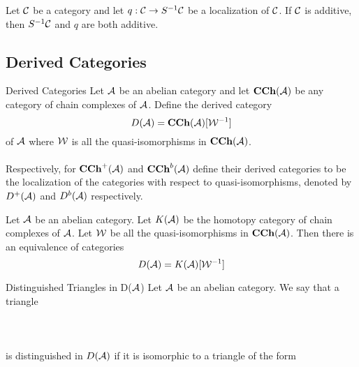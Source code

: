 \documentclass[a4paper]{article}
\begin{document}
\begin{crl}{}{} Let $\mathcal{C}$ be a category and let $q:\mathcal{C}\to S^{-1}\mathcal{C}$ be a localization of $\mathcal{C}$. If $\mathcal{C}$ is additive, then $S^{-1}\mathcal{C}$ and $q$ are both additive. 
\end{crl}

\subsection{Derived Categories}
\begin{defn}{Derived Categories}{} Let $\mathcal{A}$ be an abelian category and let $\bold{CCh}(\mathcal{A})$ be any category of chain complexes of $\mathcal{A}$. Define the derived category $$D(\mathcal{A})=\bold{CCh}(\mathcal{A})[\mathcal{W}^{-1}]$$ of $\mathcal{A}$ where $\mathcal{W}$ is all the quasi-isomorphisms in $\bold{CCh}(\mathcal{A})$. \\~\\

Respectively, for $\bold{CCh}^+(\mathcal{A})$ and $\bold{CCh}^b(\mathcal{A})$ define their derived categories to be the localization of the categories with respect to quasi-isomorphisms, denoted by $D^+(\mathcal{A})$ and $D^b(\mathcal{A})$ respectively. 
\end{defn}

\begin{thm}{}{} Let $\mathcal{A}$ be an abelian category. Let $K(\mathcal{A})$ be the homotopy category of chain complexes of $\mathcal{A}$. Let $\mathcal{W}$ be all the quasi-isomorphisms in $\bold{CCh}(\mathcal{A})$. Then there is an equivalence of categories $$D(\mathcal{A})=K(\mathcal{A})[\mathcal{W}^{-1}]$$
\end{thm}

\begin{defn}{Distinguished Triangles in D($\mathcal{A}$)}{} Let $\mathcal{A}$ be an abelian category. We say that a triangle \\~\\
\\~\\
is distinguished in $D(\mathcal{A})$ if it is isomorphic to a triangle of the form \\~\\
\end{defn}
\end{document}
